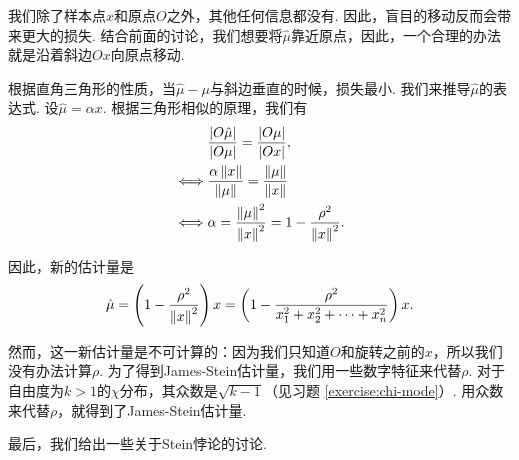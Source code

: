 我们除了样本点$x$和原点$O$之外，其他任何信息都没有. 因此，盲目的移动反而会带来更大的损失. 结合前面的讨论，我们想要将$\hat\mu$靠近原点，因此，一个合理的办法就是沿着斜边$Ox$向原点移动. 

根据直角三角形的性质，当$\hat\mu-\mu$与斜边垂直的时候，损失最小. 我们来推导$\hat\mu$的表达式. 设$\hat\mu=\alpha x$. 根据三角形相似的原理，我们有
\begin{align*}
    &\frac{|O\hat\mu|}{|O\mu|}= \frac{|O\mu|}{|Ox|},\\
    \iff&\frac{\alpha\left\|x\right\|}{\left\|\mu\right\|}=\frac{\left\|\mu\right\|}{\left\|x\right\|}\\
    \iff&\alpha = \frac{\left\|\mu\right\|^2}{\left\|x\right\|^2}=1-\frac{\rho^2}{\left\|x\right\|^2}.
\end{align*}

因此，新的估计量是
\[\hat\mu = \left(1-\frac{\rho^2}{\left\|x\right\|^2}\right)x=\left(1-\frac{\rho^2}{x_1^2+x_2^2+\dots+x_n^2}\right)x.\]

然而，这一新估计量是不可计算的：因为我们只知道$O$和旋转之前的$x$，所以我们没有办法计算$\rho$. 为了得到James-Stein估计量，我们用一些数字特征来代替$\rho$. 对于自由度为$k>1$的$\chi$分布，其众数是$\sqrt{k-1}$（见习题 \ref{exercise:chi-mode}）. 用众数来代替$\rho$，就得到了James-Stein估计量. 

最后，我们给出一些关于Stein悖论的讨论. 

